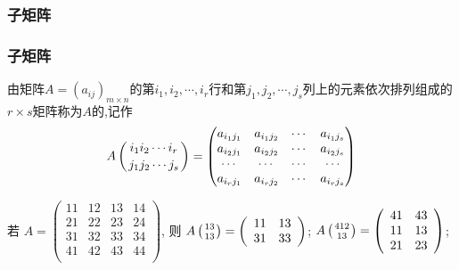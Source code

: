 \subsubsection{子矩阵}
\begin{frame}\frametitle{子矩阵}
\pp
\begin{definition}
由矩阵$A=(a_{ij})_{m\times n}$的第$i_1,i_2,\cdots,i_r$行和第$j_1,j_2,\cdots,j_s$列上的元素依次排列组成的$r\times s$矩阵称为$A$的,记作
\[A\left({i_1i_2\cdots i_r\atop j_1j_2\cdots j_s}\right) = \begin{pmatrix}
a_{i_1j_1}&a_{i_1j_2}&\cdots&a_{i_1j_s}\\
a_{i_2j_1}&a_{i_2j_2}&\cdots&a_{i_2j_s}\\
\cdots&\cdots&\cdots&\cdots\\
a_{i_rj_1}&a_{i_rj_2}&\cdots&a_{i_rj_s}\\
\end{pmatrix}\]
\end{definition}
\pp
\begin{example}
若 $A=\left(\begin{array}{cccc}
11 & 12 & 13 & 14\\
21 & 22 & 23 & 24\\
31 & 32 & 33 & 34\\
41 & 42 & 43 & 44\\
\end{array}\right)$,
\pp
则 $A\left({{1 3}\atop {1 3}}\right)  =  \left(\begin{array}{cccc}
11 & 13 \\
31 & 33 \\
\end{array}\right)$;
\pp
$A\left({{412}\atop {13}}\right) =  \left(\begin{array}{cccc}
41 & 43\\
11 & 13\\
21 & 23\\
\end{array}\right)$;
\end{example}
\end{frame}





